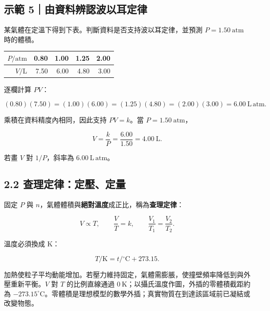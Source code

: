 \documentclass[11pt,a4paper]{article}
\newcounter{none}
\begin{document}
\begin{HandoutWorkedExample}

\subsection{示範 5｜由資料辨認波以耳定律}\label{ux793aux7bc4-5ux7531ux8cc7ux6599ux8fa8ux8a8dux6ce2ux4ee5ux8033ux5b9aux5f8b}

某氣體在定溫下得到下表。判斷資料是否支持波以耳定律，並預測 \(P=1.50\ \mathrm{atm}\) 時的體積。

{\def\LTcaptype{none} %
\begin{longtable}[]{@{}rrrrr@{}}
\toprule\noalign{}
\(P/\mathrm{atm}\) & 0.80 & 1.00 & 1.25 & 2.00 \\
\midrule\noalign{}
\endhead
\bottomrule\noalign{}
\endlastfoot
\(V/\mathrm L\) & 7.50 & 6.00 & 4.80 & 3.00 \\
\end{longtable}
}

逐欄計算 \(PV\)：

\[
(0.80)(7.50)=(1.00)(6.00)=(1.25)(4.80)=(2.00)(3.00)=6.00\ \mathrm{L\,atm}.
\]

乘積在資料精度內相同，因此支持 \(PV=k\)。當 \(P=1.50\ \mathrm{atm}\)，

\[
V=\frac{k}{P}=\frac{6.00}{1.50}=4.00\ \mathrm L.
\]

若畫 \(V\) 對 \(1/P\)，斜率為 \(6.00\ \mathrm{L\,atm}\)。

\end{HandoutWorkedExample}

\subsection{2.2 查理定律：定壓、定量}\label{ux67e5ux7406ux5b9aux5f8bux5b9aux58d3ux5b9aux91cf}

固定 \(P\) 與 \(n\)，氣體體積與\textbf{絕對溫度}成正比，稱為\textbf{查理定律}：

\[
V\propto T,
\qquad \frac{V}{T}=k,
\qquad \frac{V_1}{T_1}=\frac{V_2}{T_2}.
\]

溫度必須換成 K：

\[
T/\mathrm K=t/{}^\circ\mathrm C+273.15.
\]

加熱使粒子平均動能增加。若壓力維持固定，氣體需膨脹，使撞壁頻率降低到與外壓重新平衡。\(V\) 對 \(T\) 的比例直線通過 \(0\ \mathrm K\)；以攝氏溫度作圖，外插的零體積截距約為 \(-273.15^\circ\mathrm C\)。零體積是理想模型的數學外插；真實物質在到達該區域前已凝結或改變物態。
\end{document}
